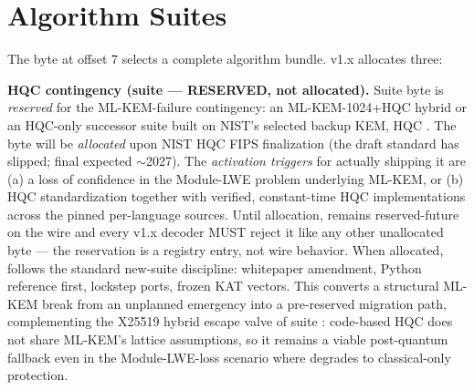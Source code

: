 \section{Algorithm Suites}
\label{sec:suites}

The  byte at offset 7 selects a complete algorithm bundle. v1.x allocates three:

\begin{center}
\small
\end{center}

\textbf{HQC contingency (suite  --- RESERVED, not allocated).} Suite byte  is
\emph{reserved} for the ML-KEM-failure contingency: an ML-KEM-1024+HQC hybrid or an HQC-only successor
suite built on NIST's selected backup KEM, HQC \citep{nisthqc2025}. The byte will be \emph{allocated} upon
NIST HQC FIPS finalization (the draft standard has slipped; final expected $\sim$2027). The
\emph{activation triggers} for actually shipping it are (a) a loss of confidence in the Module-LWE problem
underlying ML-KEM, or (b) HQC standardization together with verified, constant-time HQC implementations
across the pinned per-language sources. Until allocation,  remains reserved-future on the wire
and every v1.x decoder MUST reject it like any other unallocated byte --- the reservation is a registry
entry, not wire behavior. When allocated,  follows the standard new-suite discipline:
whitepaper amendment, Python reference first, lockstep ports, frozen KAT vectors. This converts a
structural ML-KEM break from an unplanned emergency into a pre-reserved migration path, complementing the
X25519 hybrid escape valve of suite : code-based HQC does not share ML-KEM's lattice
assumptions, so it remains a viable post-quantum fallback even in the Module-LWE-loss scenario where
 degrades to classical-only protection.

